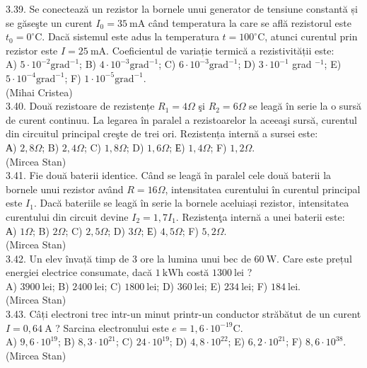 \documentclass[10pt]{article}
\begin{document}
3.39. Se conectează un rezistor la bornele unui generator de tensiune constantă și se găseşte un curent $I_{0}=35 \mathrm{~mA}$ când temperatura la care se află rezistorul este $t_{0}=0^{\circ} \mathrm{C}$. Dacă sistemul este adus la temperatura $t=100^{\circ} \mathrm{C}$, atunci curentul prin rezistor este $I=25 \mathrm{~mA}$. Coeficientul de variație termică a rezistivității este:\\ A) $5 \cdot 10^{-2} \mathrm{grad}^{-1}$; B) $4 \cdot 10^{-3} \mathrm{grad}^{-1}$; C) $6 \cdot 10^{-3} \mathrm{grad}^{-1}$; D) $3 \cdot 10^{-1}$ grad $^{-1}$; E) $5 \cdot 10^{-4} \mathrm{grad}^{-1}$; F) $1 \cdot 10^{-5} \mathrm{grad}^{-1}$.\\ (Mihai Cristea)\\

3.40. Două rezistoare de rezistențe $R_{1}=4 \Omega$ şi $R_{2}=6 \Omega$ se leagă în serie la o sursă de curent continuu. La legarea în paralel a rezistoarelor la aceeaşi sursă, curentul din circuitul principal creşte de trei ori. Rezistența internă a sursei este:\\ А) $2,8 \Omega$; B) $2,4 \Omega$; C) $1,8 \Omega$; D) $1,6 \Omega$; Е) $1,4 \Omega$; F) $1,2 \Omega$.\\ (Mircea Stan)\\

3.41. Fie două baterii identice. Când se leagă în paralel cele două baterii la bornele unui rezistor având $R=16 \Omega$, intensitatea curentului în curentul principal este $I_{1}$. Dacă bateriile se leagă în serie la bornele aceluiași rezistor, intensitatea curentului din circuit devine $I_{2}=1,7 I_{1}$. Rezistenţa internă a unei baterii este:\\ А) $1 \Omega$; B) $2 \Omega$; C) $2,5 \Omega$; D) $3 \Omega$; Е) $4,5 \Omega$; F) $5,2 \Omega$.\\ (Mircea Stan)\\

3.42. Un elev învață timp de 3 ore la lumina unui bec de $60 \mathrm{~W}$. Care este prețul energiei electrice consumate, dacă $1 \mathrm{~kWh}$ costă $1300 \mathrm{~lei}$ ?\\ A) $3900 \mathrm{~lei}$; B) $2400 \mathrm{~lei}$; C) $1800 \mathrm{~lei}$; D) $360 \mathrm{~lei}$; E) $234 \mathrm{~lei}$; F) $184 \mathrm{~lei}$.\\ (Mircea Stan)\\

3.43. Câți electroni trec intr-un minut printr-un conductor străbătut de un curent $I=0,64 \mathrm{~A}$ ? Sarcina electronului este $e=1,6 \cdot 10^{-19} \mathrm{C}$.\\ A) $9,6 \cdot 10^{19}$; B) $8,3 \cdot 10^{21}$; C) $24 \cdot 10^{19}$; D) $4,8 \cdot 10^{22}$; E) $6,2 \cdot 10^{21}$; F) $8,6 \cdot 10^{38}$.\\ (Mircea Stan)\\
\end{document}

